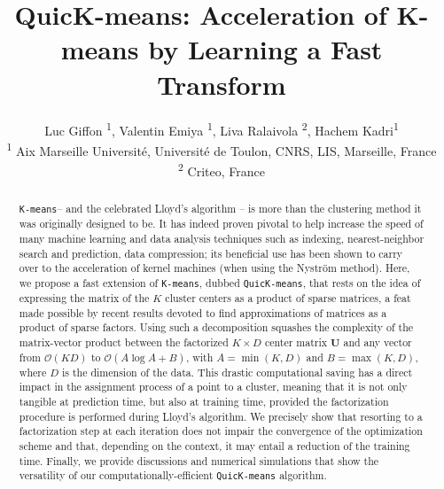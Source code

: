 \documentclass[letterpaper]{article} %
\title{QuicK-means: Acceleration of K-means by Learning a Fast Transform}
\author{}
\author{%
  Luc Giffon  \textsuperscript{\rm 1},
Valentin Emiya \textsuperscript{\rm 1},
Liva Ralaivola \textsuperscript{\rm 2},
Hachem Kadri\textsuperscript{\rm 1} \\
\textsuperscript{\rm 1} Aix Marseille Université, Université de Toulon, CNRS, LIS, Marseille, France \\
\textsuperscript{\rm 2} Criteo, France
}
\def\datadim{D}
\def\nclusters{K}
\def\kmeans{\texttt{K-means}\xspace}
\begin{document}
\maketitle

\begin{abstract}
\kmeans -- and the celebrated Lloyd's algorithm -- is more than the clustering method it was originally designed to be. 
It has indeed proven pivotal to help increase the speed of many machine learning and data analysis techniques such as indexing, nearest-neighbor search and prediction, data compression; its beneficial use has been shown to carry over to the acceleration of kernel machines (when using the Nyström method). 
Here, we propose a fast extension of \kmeans, dubbed \texttt{QuicK-means}, that rests on the idea of expressing the matrix of the $\nclusters$ cluster centers as a product of sparse matrices, a feat made possible by recent results devoted to find approximations of matrices as a product of sparse factors.
Using such a decomposition squashes the complexity of the matrix-vector product between the factorized $\nclusters \times \datadim$ center matrix $\mathbf{U}$ and any vector from $\mathcal{O}(\nclusters \datadim)$ to $\mathcal{O}(A \log A+B)$, with $A=\min (\nclusters,\datadim)$ and $B=\max (\nclusters,\datadim)$, where $\datadim$ is the dimension of the data. 
This drastic computational saving has a direct impact in the assignment process of a point to a cluster, meaning that it is not only tangible at prediction time, but also at training time, provided the factorization procedure is performed during Lloyd's algorithm. 
We precisely show that resorting to a factorization step at each iteration does not impair the convergence of the optimization scheme and that, depending on the context, it may entail a reduction of the training time. Finally, we provide discussions and numerical simulations that show the versatility of our computationally-efficient  \texttt{QuicK-means} algorithm. 
\end{abstract}








\pagebreak
\pagebreak
\appendix

\end{document}
